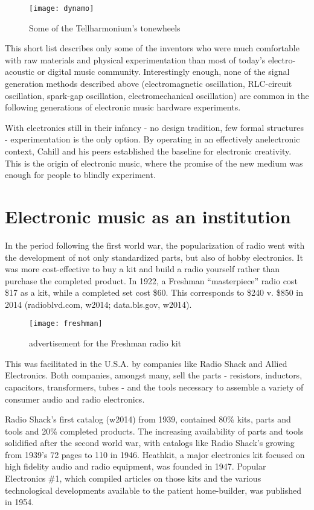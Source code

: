 	\begin{figure}[h!]
	  \caption{Some of the Tellharmonium's tonewheels}
	  \centering
	    \texttt{[image: dynamo]}
	\end{figure}

	This short list describes only some of the inventors who were much comfortable with raw materials and physical experimentation than most of today’s electro-acoustic or digital music community. Interestingly enough, none of the signal generation methods described above (electromagnetic oscillation, RLC-circuit oscillation, spark-gap oscillation, electromechanical oscillation) are common in the following generations of electronic music hardware experiments. 

	With electronics still in their infancy - no design tradition, few formal structures -  experimentation is the only option. By operating in an effectively anelectronic context, Cahill and his peers established the baseline for electronic creativity. This is the origin of electronic music, where the promise of the new medium was enough for people to blindly experiment. 

\section{Electronic music as an institution}

In the period following the first world war, the popularization of radio went with the development of not only standardized parts, but also of hobby electronics. It was more cost-effective to buy a kit and build a radio yourself rather than purchase the completed product. In 1922, a Freshman “masterpiece” radio cost \$17 as a kit, while a completed set cost \$60. This corresponds to \$240 v. \$850 in 2014 (radioblvd.com, w2014; data.bls.gov, w2014). 

	\begin{figure}[h!]
	  \caption{advertisement for the Freshman radio kit}
	  \centering
	    \texttt{[image: freshman]}
	\end{figure}

This was facilitated in the U.S.A. by companies like Radio Shack and Allied Electronics. Both companies, amongst many, sell the parts - resistors, inductors, capacitors, transformers, tubes - and the tools necessary to assemble a variety of consumer audio and radio electronics. 

Radio Shack’s first catalog (w2014) from 1939, contained 80\% kits, parts and tools and 20\% completed products. The increasing availability of parts and tools solidified after the second world war, with catalogs like Radio Shack’s growing from 1939’s 72 pages to 110 in 1946. Heathkit, a major electronics kit focused on high fidelity audio and radio equipment, was founded in 1947. Popular Electronics \#1, which compiled articles on those kits and the various technological developments available to the patient home-builder, was published in 1954. 

